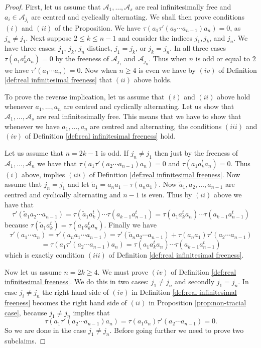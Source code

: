 \documentclass[11pt]{amsart}
\theoremstyle{definition}
\numberwithin{theorem}{section}
\newcommand{\cA}{\mathcal{A}}
\newcommand{\ab}{\allowbreak}
\begin{document}
\begin{proof}
First, let us assume that $\cA_1, \dots, \cA_s$ are real
infinitesimally free and $a_i \in \cA_{j_i}$ are centred and
cyclically alternating. We shall then prove conditions $(i)$
and $(ii)$ of the Proposition. We have $\tau(a_1\tau'(a_2
\cdots a_{n-1})a_n)\ab = 0$, as $j_n \not= j_1$. Next
suppose $2 \leq k \leq n-1$ and consider the indices $j_1,
j_k$, and $j_n$. We have three cases: $j_1$, $j_k$, $j_n$
distinct, $j_1 = j_k$, or $j_k = j_n$. In all three cases
$\tau(a_1 a_k^t a_n) = 0$ by the freeness of $\cA_{j_1}$ and
$\cA_{j_n}$. Thus when $n$ is odd or equal to $2$ we have
$\tau'(a_1 \cdots a_n) = 0$. Now when $n \geq 4$ is even we
have by $(iv)$ of Definition \ref{def:real infinitesimal
  freeness} that $(ii)$ above holds.

To prove the reverse implication, let us assume that $(i)$
and $(ii)$ above hold whenever $a_1, \dots, a_n$ are centred
and cyclically alternating. Let us show that $\cA_1, \dots,
\cA_s$ are real infinitesimally free. This means that we
have to show that whenever we have $a_1, \dots, a_n$ are
centred and alternating, the conditions $(iii)$ and $(iv)$
of Definition \ref{def:real infinitesimal freeness} hold.

Let us assume that $n = 2k -1$ is odd. If $j_n \not = j_1$
then just by the freeness of $\cA_1, \dots, \cA_n$ we have
that $\tau(a_1 \tau'(a_2 \cdots a_{n-1})a_n) = 0$ and
$\tau(a_1 a_k^t a_n) = 0$. Thus $(i)$ above, implies $(iii)$
of Definition \ref{def:real infinitesimal freeness}. Now
assume that $j_n = j_1$ and let $\tilde{a}_1 = a_na_1 -
\tau(a_n a_1)$. Now $\tilde{a}_1, a_2, \dots, a_{n-1}$ are
centred and cyclically alternating and $n-1$ is even. Thus
by $(ii)$ above we have that
\[
\tau'(\tilde{a}_1 a_2 \cdots a_{n-1}) = \tau(\tilde{a}_1 a_k^t) \cdots \tau(a_{k-1}a_{n-1}^t) = \tau(a_1 a_k^t a_n) \cdots \tau(a_{k-1}a_{n-1}^t)
\]
\noindent
because $\tau(\tilde{a}_1a_k^t) = \tau(a_1 a_k^t a_n)$. Finally we have
\[
\tau'(a_1 \cdots a_n) = \tau'(a_n a_1 \cdots a_{n-1}) 
=
\tau'(\tilde{a}_n a_2 \cdots a_{n-1}) + \tau(a_na_1) \tau'(a_2 \cdots a_{n-1})
\]
\[
= \tau(a_1 \tau'(a_2 \cdots a_{n-1}) a_n) =
\tau(a_1 a_k^t a_n) \cdots \tau(a_{k-1}a_{n-1}^t)
\]
which is exactly condition $(iii)$ of Definition
\ref{def:real infinitesimal freeness}.

Now let us assume $n = 2k \geq 4$. We must prove $(iv)$ of
Definition \ref{def:real infinitesimal freeness}. We do this
in two cases: $j_1 \not = j_n$ and secondly $j_1 = j_n$. In
case $j_i \not = j_n$ the right hand side of $(iv)$ in
Definition \ref{def:real infinitesimal freeness} becomes the
right hand side of $(ii)$ in Proposition
\ref{prop:non-tracial case}, because $j_1 \not = j_n$
implies that
\[
\tau(a_1 \tau'(a_2 \cdots a_{n-1}) a_n)
=
\tau(a_1 a_n) \tau'(a_2 \cdots a_{n-1}) =0 . 
\]
So we are done in the case $j_1 \not = j_n$. Before going
further we need to prove two subclaims.


\end{proof}
\end{document}
